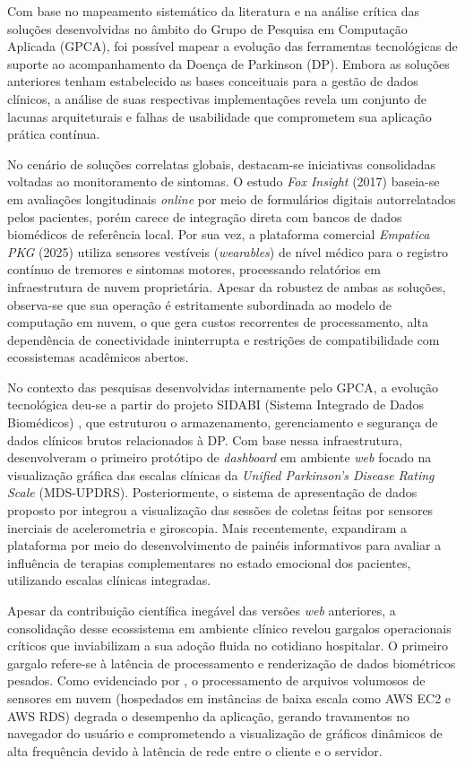Com base no mapeamento sistemático da literatura e na análise crítica das soluções desenvolvidas no âmbito do Grupo de Pesquisa em Computação Aplicada (GPCA), foi possível mapear a evolução das ferramentas tecnológicas de suporte ao acompanhamento da Doença de Parkinson (DP). Embora as soluções anteriores tenham estabelecido as bases conceituais para a gestão de dados clínicos, a análise de suas respectivas implementações revela um conjunto de lacunas arquiteturais e falhas de usabilidade que comprometem sua aplicação prática contínua.

No cenário de soluções correlatas globais, destacam-se iniciativas consolidadas voltadas ao monitoramento de sintomas. O estudo \textit{Fox Insight} (2017) baseia-se em avaliações longitudinais \textit{online} por meio de formulários digitais autorrelatados pelos pacientes, porém carece de integração direta com bancos de dados biomédicos de referência local. Por sua vez, a plataforma comercial \textit{Empatica PKG} (2025) utiliza sensores vestíveis (\textit{wearables}) de nível médico para o registro contínuo de tremores e sintomas motores, processando relatórios em infraestrutura de nuvem proprietária. Apesar da robustez de ambas as soluções, observa-se que sua operação é estritamente subordinada ao modelo de computação em nuvem, o que gera custos recorrentes de processamento, alta dependência de conectividade ininterrupta e restrições de compatibilidade com ecossistemas acadêmicos abertos.

No contexto das pesquisas desenvolvidas internamente pelo GPCA, a evolução tecnológica deu-se a partir do projeto SIDABI (Sistema Integrado de Dados Biomédicos) \cite{folador2021}, que estruturou o armazenamento, gerenciamento e segurança de dados clínicos brutos relacionados à DP. Com base nessa infraestrutura, \cite{oliveira2021} desenvolveram o primeiro protótipo de \textit{dashboard} em ambiente \textit{web} focado na visualização gráfica das escalas clínicas da \textit{Unified Parkinson's Disease Rating Scale} (MDS-UPDRS). Posteriormente, o sistema de apresentação de dados proposto por \cite{costa2022sistema} integrou a visualização das sessões de coletas feitas por sensores inerciais de acelerometria e giroscopia. Mais recentemente, \cite{oliveira2023} expandiram a plataforma por meio do desenvolvimento de painéis informativos para avaliar a influência de terapias complementares no estado emocional dos pacientes, utilizando escalas clínicas integradas.

Apesar da contribuição científica inegável das versões \textit{web} anteriores, a consolidação desse ecossistema em ambiente clínico revelou gargalos operacionais críticos que inviabilizam a sua adoção fluida no cotidiano hospitalar. O primeiro gargalo refere-se à latência de processamento e renderização de dados biométricos pesados. Como evidenciado por \cite{costa2022sistema}, o processamento de arquivos volumosos de sensores em nuvem (hospedados em instâncias de baixa escala como AWS EC2 e AWS RDS) degrada o desempenho da aplicação, gerando travamentos no navegador do usuário e comprometendo a visualização de gráficos dinâmicos de alta frequência devido à latência de rede entre o cliente e o servidor.

